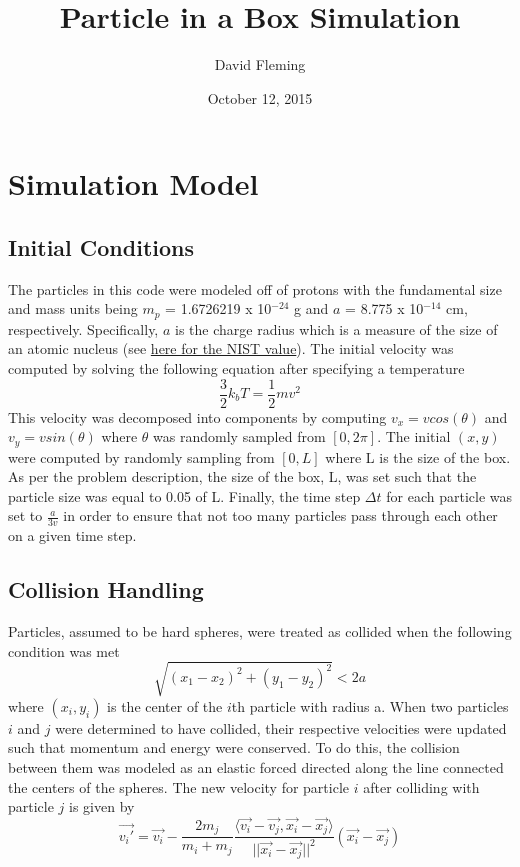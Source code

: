 \documentclass[12pt]{amsart}
\title{Particle in a Box Simulation}
\author{David Fleming}
\date{October 12, 2015} %
\begin{document}
\maketitle

\section{Simulation Model}
\subsection{Initial Conditions}

The particles in this code were modeled off of protons with the fundamental size and mass units being $m_p$ = 1.6726219 x 10$^{-24}$ g and $a$ = 8.775 x 10$^{-14}$ cm, respectively.  Specifically, $a$ is the charge radius which is a measure of the size of an atomic nucleus (see \href{http://physics.nist.gov/cgi-bin/cuu/Value?rp}{here for the NIST value}).  The initial velocity was computed by solving the following equation after specifying a temperature $$ \frac{3}{2} k_b T = \frac{1}{2} m v^2 $$  This velocity was decomposed into components by computing $v_x = vcos(\theta)$ and $v_y = vsin(\theta)$ where $\theta$ was randomly sampled from $[0,2 \pi]$. The initial $(x,y)$  were computed by randomly sampling from $[0,L]$ where L is the size of the box.  As per the problem description, the size of the box, L, was set such that the particle size was equal to 0.05 of L.  Finally, the time step $\Delta t$ for each particle was set to $\frac{a}{3v}$ in order to ensure that not too many particles pass through each other on a given time step.

\subsection{Collision Handling}

Particles, assumed to be hard spheres, were treated as collided when the following condition was met
$$ \sqrt{(x_1 - x_2)^2 + (y_1 - y_2)^2} < 2a  $$ where $(x_i,y_i)$ is the center of the $i$th particle with radius a.  When two particles $i$ and $j$ were determined to have collided, their respective velocities were updated such that momentum and energy were conserved.  To do this, the collision between them was modeled as an elastic forced directed along the line connected the centers of the spheres.  The new velocity for particle $i$ after colliding with particle $j$ is given by
$$ \vec{v_i'} = \vec{v_i} - \frac{2 m_j}{m_i + m_j} \frac{\langle \vec{v_i} - \vec{v_j}, \vec{x_i} - \vec{x_j}{ \rangle}}{||\vec{x_i} - \vec{x_j}||^2} (\vec{x_i} - \vec{x_j}) $$
  
\end{document}
